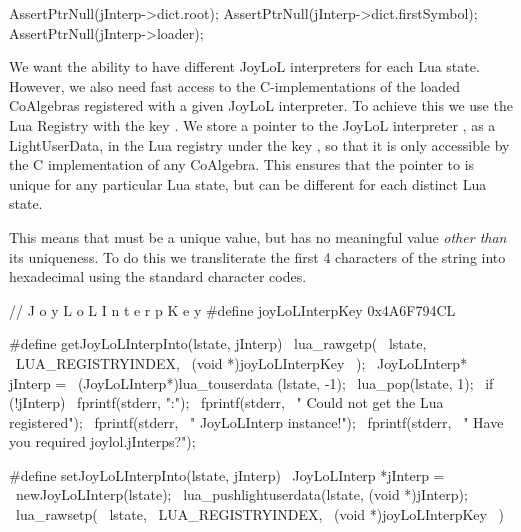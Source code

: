   AssertPtrNull(jInterp->dict.root);
  AssertPtrNull(jInterp->dict.firstSymbol);
  AssertPtrNull(jInterp->loader);
\stopCTest
\stopTestCase
\stopTestSuite


We want the ability to have different JoyLoL interpreters for each Lua 
state. However, we also need fast access to the C-implementations of the 
loaded CoAlgebras registered with a given JoyLoL interpreter. To achieve 
this we use the Lua Registry with the  key 
. We store a pointer to the JoyLoL interpreter 
, as a LightUserData, in the Lua registry under the key 
, so that it is only accessible by the C 
implementation of any CoAlgebra. This ensures that the pointer to 
 is unique for any particular Lua state, but can be 
different for each distinct Lua state. 

This means that  must be a unique value, but has no 
meaningful value \emph{other than} its uniqueness. To do this we 
transliterate the first 4 characters of the string  
into hexadecimal using the standard  character codes. 

\startCHeader
//                         J o y L o L I n t e r p K e y
#define joyLoLInterpKey 0x4A6F794CL

#define getJoyLoLInterpInto(lstate, jInterp)      \
  lua_rawgetp(                                    \
    lstate,                                       \
    LUA_REGISTRYINDEX,                            \
    (void *)joyLoLInterpKey                       \
  );                                              \
  JoyLoLInterp* jInterp =                         \
    (JoyLoLInterp*)lua_touserdata (lstate, -1);   \
  lua_pop(lstate, 1);                             \
  if (!jInterp) {                                 \
    fprintf(stderr, "\nERROR:\n");                \
    fprintf(stderr,                               \
      "  Could not get the Lua registered\n");    \
    fprintf(stderr,                               \
      "  JoyLoLInterp instance!\n");              \
    fprintf(stderr,                               \
      "  Have you required joylol.jInterps?\n");  \
  }
\stopCHeader

\setCHeaderStream{private}
\startCHeader
#define setJoyLoLInterpInto(lstate, jInterp)      \
  JoyLoLInterp *jInterp =                         \
    newJoyLoLInterp(lstate);                      \
  lua_pushlightuserdata(lstate, (void *)jInterp); \
  lua_rawsetp(                                    \
    lstate,                                       \
    LUA_REGISTRYINDEX,                            \
    (void *)joyLoLInterpKey                       \
  )
\stopCHeader
\setCHeaderStream{public}


